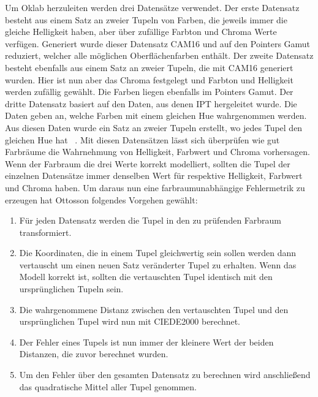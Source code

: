 \documentclass[12pt, a4paper, ngerman]{article}
\begin{document}
Um Oklab herzuleiten werden drei Datensätze verwendet. 
Der erste Datensatz besteht aus einem Satz an zweier Tupeln von Farben, die jeweils immer die gleiche Helligkeit haben, aber über zufällige Farbton und Chroma Werte verfügen.
Generiert wurde dieser Datensatz CAM16 und auf den Pointers Gamut reduziert, welcher alle möglichen Oberflächenfarben enthält.
Der zweite Datensatz besteht ebenfalls aus einem Satz an zweier Tupeln, die mit CAM16 generiert wurden. 
Hier ist nun aber das Chroma festgelegt und Farbton und Helligkeit werden zufällig gewählt. Die Farben liegen ebenfalls im Pointers Gamut.
Der dritte Datensatz basiert auf den Daten, aus denen IPT hergeleitet wurde. Die Daten geben an, welche Farben mit einem gleichen Hue wahrgenommen werden. 
Aus diesen Daten wurde ein Satz an zweier Tupeln erstellt, wo jedes Tupel den gleichen Hue hat ~\cite{Oklab_2020}.
Mit diesen Datensätzen lässt sich überprüfen wie gut Farbräume die Wahrnehmung von Helligkeit, Farbwert und Chroma vorhersagen. 
Wenn der Farbraum die drei Werte korrekt modelliert, sollten die Tupel der einzelnen Datensätze immer denselben Wert für respektive Helligkeit, Farbwert und Chroma haben.
Um daraus nun eine farbraumunabhängige Fehlermetrik zu erzeugen hat Ottosson folgendes Vorgehen gewählt:
\begin{enumerate}
  \item Für jeden Datensatz werden die Tupel in den zu prüfenden Farbraum transformiert.
  \item Die Koordinaten, die in einem Tupel gleichwertig sein sollen werden dann vertauscht um einen neuen Satz veränderter Tupel zu erhalten. Wenn das Modell korrekt ist, sollten die vertauschten Tupel identisch mit den ursprünglichen Tupeln sein. 
  \item Die wahrgenommene Distanz zwischen den vertauschten Tupel und den ursprünglichen Tupel wird nun mit CIEDE2000 berechnet. 
  \item Der Fehler eines Tupels ist nun immer der kleinere Wert der beiden Distanzen, die zuvor berechnet wurden.
  \item Um den Fehler über den gesamten Datensatz zu berechnen wird anschließend das quadratische Mittel aller Tupel genommen.
\end{enumerate}
\end{document}
